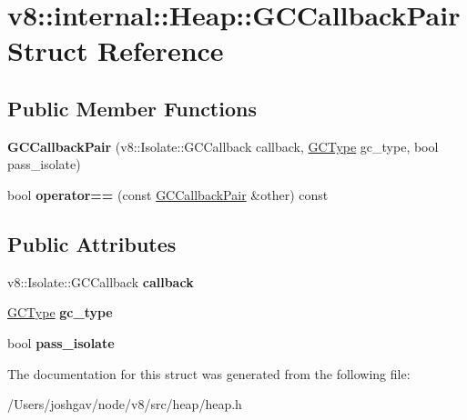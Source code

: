 \hypertarget{structv8_1_1internal_1_1_heap_1_1_g_c_callback_pair}{}\section{v8\+:\+:internal\+:\+:Heap\+:\+:G\+C\+Callback\+Pair Struct Reference}
\label{structv8_1_1internal_1_1_heap_1_1_g_c_callback_pair}
\subsection*{Public Member Functions}
\begin{DoxyCompactItemize}
\item 
{\bfseries G\+C\+Callback\+Pair} (v8\+::\+Isolate\+::\+G\+C\+Callback callback, \hyperlink{namespacev8_ac109d6f27e0c0f9ef4e98bcf7a806cf2}{G\+C\+Type} gc\+\_\+type, bool pass\+\_\+isolate)\hypertarget{structv8_1_1internal_1_1_heap_1_1_g_c_callback_pair_a30f668fa0983e3a55c8a5a2d5546f71c}{}\label{structv8_1_1internal_1_1_heap_1_1_g_c_callback_pair_a30f668fa0983e3a55c8a5a2d5546f71c}

\item 
bool {\bfseries operator==} (const \hyperlink{structv8_1_1internal_1_1_heap_1_1_g_c_callback_pair}{G\+C\+Callback\+Pair} \&other) const \hypertarget{structv8_1_1internal_1_1_heap_1_1_g_c_callback_pair_ae5f623159531a44a3ce678c555d286e3}{}\label{structv8_1_1internal_1_1_heap_1_1_g_c_callback_pair_ae5f623159531a44a3ce678c555d286e3}

\end{DoxyCompactItemize}
\subsection*{Public Attributes}
\begin{DoxyCompactItemize}
\item 
v8\+::\+Isolate\+::\+G\+C\+Callback {\bfseries callback}\hypertarget{structv8_1_1internal_1_1_heap_1_1_g_c_callback_pair_ad18ed9841f8dd8d7997248f758873fb0}{}\label{structv8_1_1internal_1_1_heap_1_1_g_c_callback_pair_ad18ed9841f8dd8d7997248f758873fb0}

\item 
\hyperlink{namespacev8_ac109d6f27e0c0f9ef4e98bcf7a806cf2}{G\+C\+Type} {\bfseries gc\+\_\+type}\hypertarget{structv8_1_1internal_1_1_heap_1_1_g_c_callback_pair_aac122a5ae3653762c2efbb2ad81a28ac}{}\label{structv8_1_1internal_1_1_heap_1_1_g_c_callback_pair_aac122a5ae3653762c2efbb2ad81a28ac}

\item 
bool {\bfseries pass\+\_\+isolate}\hypertarget{structv8_1_1internal_1_1_heap_1_1_g_c_callback_pair_aa06a16ea42ac6634708f908636739286}{}\label{structv8_1_1internal_1_1_heap_1_1_g_c_callback_pair_aa06a16ea42ac6634708f908636739286}

\end{DoxyCompactItemize}


The documentation for this struct was generated from the following file\+:\begin{DoxyCompactItemize}
\item 
/\+Users/joshgav/node/v8/src/heap/heap.\+h\end{DoxyCompactItemize}
